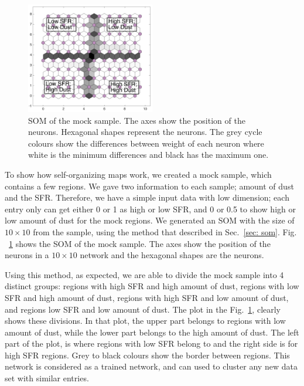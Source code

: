          \begin{figure}
                \centering
                \includegraphics[width=0.5\textwidth]{../image_paper3/images0.01/mock_sample.png}
            \caption{SOM of the mock sample. The axes show the position of the neurons. Hexagonal shapes represent the neurons. The grey cycle colours show the differences between weight of each neuron where white is the minimum differences and black has the maximum one.}
            \label{fig: sample}
        \end{figure}
 
To show how self-organizing maps work, we created a mock sample, which contains a few regions.
We gave two information to each sample; amount of dust and the SFR.
 Therefore, we have a simple input data with low dimension; each entry only can get either 0 or 1 as high or low SFR, and 0 or 0.5 to show high or low amount of dust for the mock regions.
 We generated an SOM with the size of $10 \times 10$ from the sample, using the method that described in Sec.~\ref{sec: som}.
 Fig. ~\ref{fig: sample} shows the SOM of the mock sample. 
 The axes show the position of the neurons in a $10 \times 10$ network and the hexagonal shapes are the neurons.
 
Using this method, as expected, we are able to divide the mock sample into 4 distinct groups: regions with high SFR and high amount of dust, regions with low SFR and high amount of dust, regions with high SFR and low amount of dust, and regions low SFR and low amount of dust. 
The plot in the Fig.~\ref{fig: sample}, clearly shows these divisions.
In that plot, the upper part belongs to regions with low amount of dust, while the lower part belongs to the high amount of dust.
The left part of the plot, is where regions with low SFR belong to and the right side is for high SFR regions.
Grey to black colours show the border between regions.
This network is considered as a trained network, and can used to cluster any new data set with similar entries.

